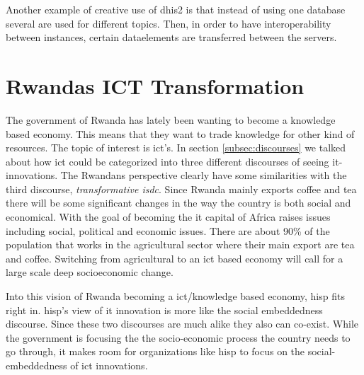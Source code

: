 Another example of creative use of \gls{dhis2} is that instead of using one database several are used for different topics. Then, in order to have interoperability between instances, certain dataelements are transferred between the servers. 

\section{Rwandas ICT Transformation}
The government of Rwanda has lately been wanting to become a knowledge based economy. 
This means that they want to trade knowledge for other kind of resources. 
The topic of interest is \gls{ict}'s.
In section \ref{subsec:discourses} we talked about how \gls{ict} could be categorized into three different discourses of seeing \gls{it}-innovations. 
The Rwandans perspective clearly have some similarities with the third discourse, \textit{transformative \gls{isdc}}. 
Since Rwanda mainly exports coffee and tea there will be some significant changes in the way the country is both social and economical. 
With the goal of becoming the \gls{it} capital of Africa raises issues including social, political and economic issues. 
There are about 90\% of the population that works in the agricultural sector where their main export are tea and coffee. 
Switching from agricultural to an \gls{ict} based economy will call for a large scale deep socioeconomic change.

Into this vision of Rwanda becoming a \gls{ict}/knowledge based economy, \gls{hisp} fits right in.
\gls{hisp}'s view of \gls{it} innovation is more like the social embeddedness discourse.
Since these two discourses are much alike they also can co-exist. While the government is focusing the the socio-economic process the country needs to go through, it makes room for organizations like \gls{hisp} to focus on the social-embeddedness of \gls{ict} innovations.

